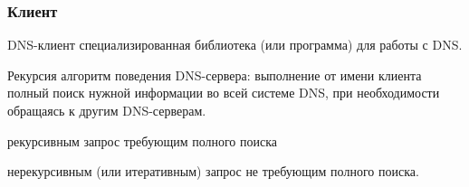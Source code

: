 \begin{frame}
  \frametitle{Клиент}

\begin{block}{DNS-клиент} 
  специализированная библиотека (или программа) для работы с DNS.
\end{block} 

\begin{block}{Рекурсия}
  алгоритм поведения DNS-сервера: выполнение от имени клиента полный поиск нужной информации во всей системе DNS, при необходимости обращаясь к другим DNS-серверам.
\end{block}

\begin{block}{рекурсивным запрос} 
  требующим полного поиска
\end{block}

\begin{block}{нерекурсивным (или итеративным) запрос} 
  не требующим полного поиска.
\end{block}

\end{frame}